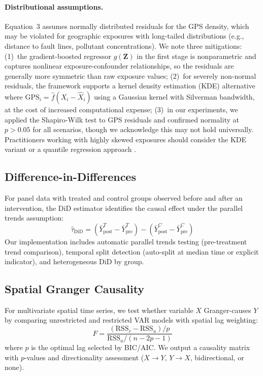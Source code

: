 \documentclass{article}
\begin{document}
\paragraph{Distributional assumptions.} Equation~3 assumes normally distributed residuals for the GPS density, which may be violated for geographic exposures with long-tailed distributions (e.g., distance to fault lines, pollutant concentrations). We note three mitigations: (1)~the gradient-boosted regressor $g(\mathbf{Z})$ in the first stage is nonparametric and captures nonlinear exposure-confounder relationships, so the residuals are generally more symmetric than raw exposure values; (2)~for severely non-normal residuals, the framework supports a kernel density estimation (KDE) alternative where $\text{GPS}_i = \hat{f}(X_i - \hat{X}_i)$ using a Gaussian kernel with Silverman bandwidth, at the cost of increased computational expense; (3)~in our experiments, we applied the Shapiro-Wilk test to GPS residuals and confirmed normality at $p > 0.05$ for all scenarios, though we acknowledge this may not hold universally. Practitioners working with highly skewed exposures should consider the KDE variant or a quantile regression approach \citep{koenker2005quantile}.

\subsection{Difference-in-Differences}

For panel data with treated and control groups observed before and after an intervention, the DiD estimator identifies the causal effect under the parallel trends assumption:
\begin{equation}
\hat{\tau}_{\text{DiD}} = (\bar{Y}^{T}_{\text{post}} - \bar{Y}^{T}_{\text{pre}}) - (\bar{Y}^{C}_{\text{post}} - \bar{Y}^{C}_{\text{pre}})
\end{equation}
Our implementation includes automatic parallel trends testing (pre-treatment trend comparison), temporal split detection (auto-split at median time or explicit indicator), and heterogeneous DiD by group.

\subsection{Spatial Granger Causality}

For multivariate spatial time series, we test whether variable $X$ Granger-causes $Y$ by comparing unrestricted and restricted VAR models with spatial lag weighting:
\begin{equation}
F = \frac{(\text{RSS}_r - \text{RSS}_u) / p}{\text{RSS}_u / (n - 2p - 1)}
\end{equation}
where $p$ is the optimal lag selected by BIC/AIC. We output a causality matrix with $p$-values and directionality assessment ($X \to Y$, $Y \to X$, bidirectional, or none).
\end{document}
